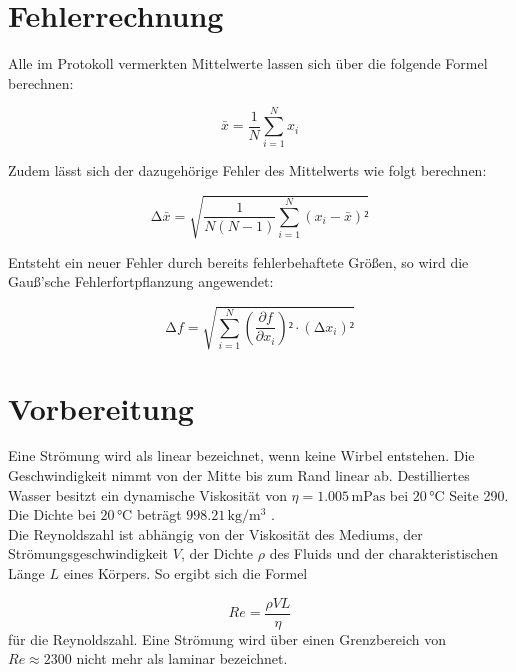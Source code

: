 \noindent

  \section{Fehlerrechnung}
  \label{sec:Fehlerrechnung}
  
  Alle im Protokoll vermerkten Mittelwerte lassen sich über die folgende Formel berechnen:
  
  \begin{equation}
  \label{eqn:Mittelwert}
      \bar{x} = \frac{1}{N}\sum_{i=1}^N x_i
  \end{equation}
  
  \noindent
  Zudem lässt sich der dazugehörige Fehler des Mittelwerts wie folgt berechnen:
  
  \begin{equation}
  \label{eqn:Mittelwertfehler}
      \increment \bar{x} = \sqrt{\frac{1}{N\left(N-1\right)}\sum_{i=1}^N \left(x_i - \bar{x}\right)²}
  \end{equation}
  
  \noindent
  Entsteht ein neuer Fehler durch bereits fehlerbehaftete Größen, so wird die Gauß'sche Fehlerfortpflanzung angewendet:
  
  \begin{equation}
  \label{eqn:Fehlerfortpflanzung}
      \increment f = \sqrt{\sum_{i=1}^N \left(\frac{\partial f}{\partial x_i}\right)²\cdot\left(\increment x_i\right)²}
  \end{equation}
  
  \section{Vorbereitung}
  Eine Strömung wird als linear bezeichnet, wenn keine Wirbel entstehen. Die Geschwindigkeit nimmt von der Mitte bis zum Rand linear ab.
  Destilliertes Wasser besitzt ein dynamische Viskosität von $\eta = 1.005\, \unit{\milli \pascal \second}$ bei $20\, \unit{\celsius}$ 
  \cite{Physikalisches_Praktikum} Seite 290. Die Dichte bei $20\, \unit{\celsius}$ beträgt $998.21\, \unit{\kilo \gram \per \cubic \meter}$
  \cite{Physikalisches_Praktikum}.\\
  \noindent
  Die Reynoldszahl ist abhängig von der Viskosität des Mediums, der Strömungsgeschwindigkeit $V$, der Dichte $\rho$ des Fluids und der 
  charakteristischen Länge $L$ eines Körpers. So ergibt sich die Formel 
  
  \begin{equation}
      Re = \frac{\rho V L}{\eta}
      \label{eqn:Reynolds}
  \end{equation}
  für die Reynoldszahl. Eine Strömung wird über einen Grenzbereich von $Re \approx 2300$ \cite{Reynolds} nicht mehr als laminar bezeichnet.

%

